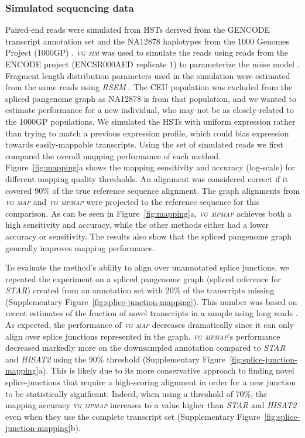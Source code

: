 \documentclass[11pt]{ucthesis}
\newcommand{\tool}[1]{\emph{\textsc{#1}}}
\begin{document}
\subsubsection{Simulated sequencing data}

Paired-end reads were simulated from HSTs derived from the GENCODE transcript annotation set \cite{frankish2019gencode} and the NA12878 haplotypes from the 1000 Genomes Project (1000GP) \cite{10002015global}. \tool{vg sim} was used to simulate the reads using reads from the ENCODE project (ENCSR000AED replicate 1) to parameterize the noise model \cite{encode2012integrated,davis2017encycolopedia}. Fragment length distribution parameters used in the simulation were estimated from the same reads using \tool{RSEM} \cite{li2011rsem}. The CEU population was excluded from the spliced pangenome graph as NA12878 is from that population, and we wanted to estimate performance for a new individual, who may not be as closely-related to the 1000GP populations. We simulated the HSTs with uniform expression rather than trying to match a previous expression profile, which could bias expression towards easily-mappable transcripts. 
\newline 
\newline 
Using the set of simulated reads we first compared the overall mapping performance of each method. Figure~\ref{fig:mapping}a shows the mapping sensitivity and accuracy (log-scale) for different mapping quality thresholds. An alignment was considered correct if it covered 90\% of the true reference sequence alignment. The graph alignments from \tool{vg map} and \tool{vg mpmap} were projected to the reference sequence for this comparison. As can be seen in Figure~\ref{fig:mapping}a, \tool{vg mpmap} achieves both a high sensitivity and accuracy, while the other methods either had a lower accuracy or sensitivity. The results also show that the spliced pangenome graph generally improves mapping performance. 

To evaluate the method's ability to align over unannotated splice junctions, we repeated the experiment on a spliced pangenome graph (spliced reference for \tool{STAR}) created from an annotation set with 20\% of the transcripts missing (Supplementary Figure~\ref{fig:splice-junction-mapping}). This number was based on recent estimates of the fraction of novel transcripts in a sample using long reads \cite{wyman2019technology}. As expected, the performance of \tool{vg map} decreases dramatically since it can only align over splice junctions represented in the graph. \tool{vg mpmap}'s performance decreased markedly more on the downsampled annotation compared to \tool{STAR} and \tool{HISAT2} using the 90\% threshold (Supplementary Figure~\ref{fig:splice-junction-mapping}a). This is likely due to its more conservative approach to finding novel splice-junctions that require a high-scoring alignment in order for a new junction to be statistically significant. Indeed, when using a threshold of 70\%, the mapping accuracy \tool{vg mpmap} increases to a value higher than \tool{STAR} and \tool{HISAT2} even when they use the complete transcript set (Supplementary Figure~\ref{fig:splice-junction-mapping}b).
\end{document}
